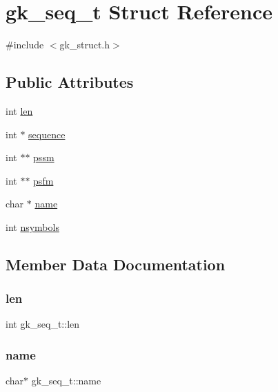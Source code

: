 \hypertarget{structgk__seq__t}{}\section{gk\+\_\+seq\+\_\+t Struct Reference}
\label{structgk__seq__t}


{\ttfamily \#include $<$gk\+\_\+struct.\+h$>$}

\subsection*{Public Attributes}
\begin{DoxyCompactItemize}
\item 
int \hyperlink{structgk__seq__t_a4970c7091d86284d10ae370aa9bf0145}{len}
\item 
int $\ast$ \hyperlink{structgk__seq__t_a5a803ced386350dd152f047531035f81}{sequence}
\item 
int $\ast$$\ast$ \hyperlink{structgk__seq__t_aca3f51322bd7246f338394a442e37e7c}{pssm}
\item 
int $\ast$$\ast$ \hyperlink{structgk__seq__t_a2f3676712f6cbb159642884a3dff7eec}{psfm}
\item 
char $\ast$ \hyperlink{structgk__seq__t_a231b4df61c5c3501eff97c408dc882b3}{name}
\item 
int \hyperlink{structgk__seq__t_a876b72b49af40e66b978e33f87cda044}{nsymbols}
\end{DoxyCompactItemize}


\subsection{Member Data Documentation}
\mbox{\label{structgk__seq__t_a4970c7091d86284d10ae370aa9bf0145}} 
\subsubsection{\texorpdfstring{len}{len}}
{\footnotesize\ttfamily int gk\+\_\+seq\+\_\+t\+::len}

\mbox{\label{structgk__seq__t_a231b4df61c5c3501eff97c408dc882b3}} 
\subsubsection{\texorpdfstring{name}{name}}
{\footnotesize\ttfamily char$\ast$ gk\+\_\+seq\+\_\+t\+::name}


